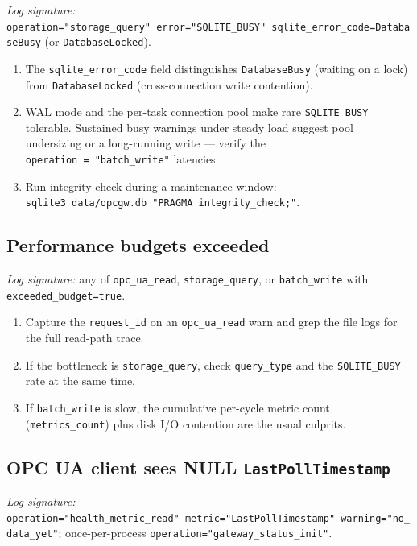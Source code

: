 \emph{Log signature:} \texttt{operation="storage\_query"\ error="SQLITE\_BUSY"\ sqlite\_error\_code=DatabaseBusy} (or \texttt{DatabaseLocked}).

\begin{enumerate}
\def\labelenumi{\arabic{enumi}.}
\item
  The \texttt{sqlite\_error\_code} field distinguishes \texttt{DatabaseBusy} (waiting on a lock) from \texttt{DatabaseLocked} (cross-connection write contention).
\item
  WAL mode and the per-task connection pool make rare \texttt{SQLITE\_BUSY} tolerable. Sustained busy warnings under steady load suggest pool undersizing or a long-running write --- verify the \texttt{operation\ =\ "batch\_write"} latencies.
\item
  Run integrity check during a maintenance window: \texttt{sqlite3\ data/opcgw.db\ "PRAGMA\ integrity\_check;"}.
\end{enumerate}

\subsection{Performance budgets exceeded}\label{sec-issue-budget-exceeded}

\emph{Log signature:} any of \texttt{opc\_ua\_read}, \texttt{storage\_query}, or \texttt{batch\_write} with \texttt{exceeded\_budget=true}.

\begin{enumerate}
\def\labelenumi{\arabic{enumi}.}
\item
  Capture the \texttt{request\_id} on an \texttt{opc\_ua\_read} warn and grep the file logs for the full read-path trace.
\item
  If the bottleneck is \texttt{storage\_query}, check \texttt{query\_type} and the \texttt{SQLITE\_BUSY} rate at the same time.
\item
  If \texttt{batch\_write} is slow, the cumulative per-cycle metric count (\texttt{metrics\_count}) plus disk I/O contention are the usual culprits.
\end{enumerate}

\subsection{\texorpdfstring{OPC UA client sees NULL \texttt{LastPollTimestamp}}{OPC UA client sees NULL LastPollTimestamp}}\label{sec-issue-no-data-yet}

\emph{Log signature:} \texttt{operation="health\_metric\_read"\ metric="LastPollTimestamp"\ warning="no\_data\_yet"}; once-per-process \texttt{operation="gateway\_status\_init"}.

